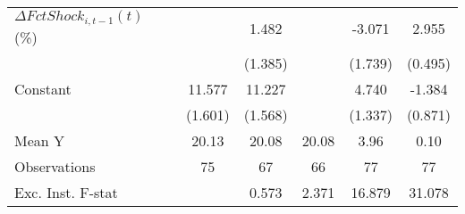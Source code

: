 {\begin{tabular}{l*{5}{c}}
\addlinespace
$ \Delta FctShock_{i,t-1}(t)$ (\%)&                     &       1.482         &                     &      -3.071         &       2.955\sym{***}\\
                    &                     &     (1.385)         &                     &     (1.739)         &     (0.495)         \\
\addlinespace
Constant            &      11.577\sym{***}&      11.227\sym{***}&                     &       4.740\sym{***}&      -1.384         \\
                    &     (1.601)         &     (1.568)         &                     &     (1.337)         &     (0.871)         \\
\midrule
Mean Y              &       20.13         &       20.08         &       20.08         &        3.96         &        0.10         \\
Observations        &          75         &          67         &          66         &          77         &          77         \\
Exc. Inst. F-stat   &                     &       0.573         &       2.371         &      16.879         &      31.078         \\
\bottomrule
\end{tabular}
}
